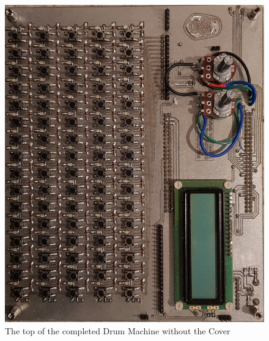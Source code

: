 \documentclass[12pt,a4paper]{report}
\begin{document}
\begin{figure}[h!]
	\centering
	\includegraphics[height=0.5\textheight, angle=90]{front_noPanel.jpg}
	\caption{The top of the completed Drum Machine without the Cover}
\end{figure}
\end{document}
